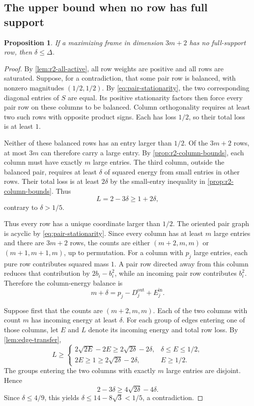\documentclass[11pt]{article}
\numberwithin{equation}{section}
\newtheorem{proposition}[proposition]{Proposition}
\theoremstyle{definition}
\theoremstyle{definition}
\begin{document}
\subsection{The upper bound when no row has full support}

\begin{proposition}\label{prop:r2-no-full}
If a maximizing frame in dimension $3m+2$ has no full-support
row, then $\delta\le\Delta$.
\end{proposition}

\begin{proof}
By \cref{lem:r2-all-active}, all row weights are positive and all
rows are saturated.  Suppose, for a contradiction, that some pair row is balanced,
with nonzero magnitudes $(1/2,1/2)$.  By \eqref{eq:pair-stationarity}, the two corresponding
diagonal entries of $S$ are equal.  Its positive stationarity factors
then force every pair row on these columns to be balanced.
Column orthogonality requires at least two such rows with opposite
product signs.  Each has loss $1/2$, so their total loss is at least
$1$.

Neither of these balanced rows has an entry larger than $1/2$.
Of the $3m+2$ rows, at most $3m$ can therefore carry a large entry.
By \cref{prop:r2-column-bounds}, each column must have exactly $m$
large entries.  The third column, outside the balanced pair,
requires at least $\delta$ of squared energy from small entries
in other rows.  Their total loss is at least $2\delta$ by the
small-entry inequality in \cref{prop:r2-column-bounds}.
Thus
\[
 L=2-3\delta\ge1+2\delta,
\]
contrary to $\delta>1/5$.

Thus every row has a unique coordinate larger than $1/2$.
The oriented pair graph is acyclic by
\eqref{eq:pair-stationarity}.  Since every column has at least
$m$ large entries and there are $3m+2$ rows, the counts are either
$(m+2,m,m)$ or $(m+1,m+1,m)$, up to permutation.
For a column with $p_j$ large entries, each pure row contributes
squared mass $1$. A pair row directed away from this column
reduces that contribution by $2b_i-b_i^2$, while an incoming
pair row contributes $b_i^2$. Therefore the column-energy balance is
\begin{equation}
 m+\delta=p_j-D_j^{\mathrm{out}}+E_j^{\mathrm{in}}.
 \label{eq:r2-vertex-balance}
\end{equation}

Suppose first that the counts are $(m+2,m,m)$.
Each of the two columns with count $m$ has incoming energy
at least $\delta$. For each group of edges entering one of those columns, let $E$
and $L$ denote its incoming energy and total row loss.  By \cref{lem:edge-transfer},
\[
 L\ge
 \begin{cases}
  2\sqrt{2E}-2E\ge2\sqrt{2\delta}-2\delta,&
      \delta\le E\le1/2,\\
  2E\ge1\ge2\sqrt{2\delta}-2\delta,&E\ge1/2.
 \end{cases}
\]
The groups entering the two columns with exactly $m$ large entries
are disjoint. Hence
\[
 2-3\delta\ge4\sqrt{2\delta}-4\delta.
\]
Since $\delta\le4/9$, this yields
$\delta\le14-8\sqrt3<1/5$, a contradiction.


\end{proof}
\end{document}
